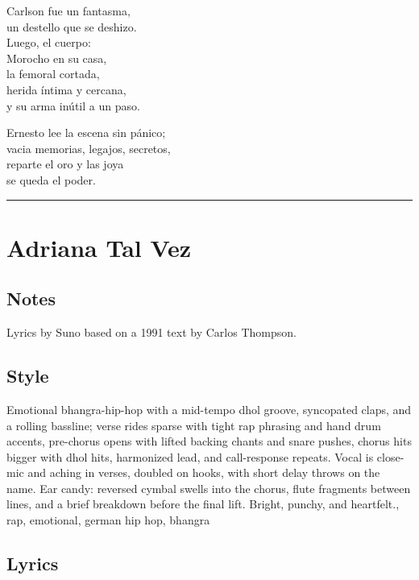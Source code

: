 Carlson fue un fantasma,\\
un destello que se deshizo.\\
Luego, el cuerpo:\\
Morocho en su casa,\\
la femoral cortada,\\
herida íntima y cercana,\\
y su arma inútil a un paso.

Ernesto lee la escena sin pánico;\\
vacia memorias, legajos, secretos,\\
reparte el oro y las joya\\
se queda el poder.

\begin{center}\rule{0.5\linewidth}{0.5pt}\end{center}

\section{Adriana Tal Vez}\label{adriana-tal-vez}

\subsection{Notes}\label{notes-20}

Lyrics by Suno based on a 1991 text by Carlos Thompson.

\subsection{Style}\label{style-20}

Emotional bhangra-hip-hop with a mid-tempo dhol groove, syncopated
claps, and a rolling bassline; verse rides sparse with tight rap
phrasing and hand drum accents, pre-chorus opens with lifted backing
chants and snare pushes, chorus hits bigger with dhol hits, harmonized
lead, and call-response repeats. Vocal is close-mic and aching in
verses, doubled on hooks, with short delay throws on the name. Ear
candy: reversed cymbal swells into the chorus, flute fragments between
lines, and a brief breakdown before the final lift. Bright, punchy, and
heartfelt., rap, emotional, german hip hop, bhangra

\subsection{Lyrics}\label{lyrics-20}

